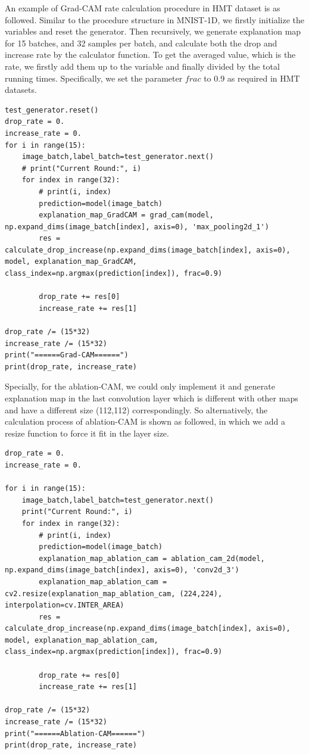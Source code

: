 \documentclass[conference]{IEEEtran}
\begin{document}
An example of Grad-CAM rate calculation procedure in HMT dataset is as followed. Similar to the procedure structure in MNIST-1D, we firstly initialize the variables and reset the generator. Then recursively, we generate explanation map for 15 batches, and 32 samples per batch, and calculate both the drop and increase rate by the calculator function. To get the averaged value, which is the rate, we firstly add them up to the variable and finally divided by the total running times. Specifically, we set the parameter $frac$ to 0.9 as required in HMT datasets.

\begin{lstlisting}
test_generator.reset()
drop_rate = 0.
increase_rate = 0.
for i in range(15):
    image_batch,label_batch=test_generator.next()
    # print("Current Round:", i)
    for index in range(32):
        # print(i, index)
        prediction=model(image_batch)
        explanation_map_GradCAM = grad_cam(model, np.expand_dims(image_batch[index], axis=0), 'max_pooling2d_1')
        res = calculate_drop_increase(np.expand_dims(image_batch[index], axis=0), model, explanation_map_GradCAM, class_index=np.argmax(prediction[index]), frac=0.9)

        drop_rate += res[0]
        increase_rate += res[1]

drop_rate /= (15*32)
increase_rate /= (15*32)
print("======Grad-CAM======")
print(drop_rate, increase_rate)
\end{lstlisting}

Specially, for the ablation-CAM, we could only implement it and generate explanation map in the last convolution layer which is different with other maps and have a different size (112,112) correspondingly. So alternatively, the calculation process of ablation-CAM is shown as followed, in which we add a resize function to force it fit in the layer size.

\begin{lstlisting}
drop_rate = 0.
increase_rate = 0.

for i in range(15):
    image_batch,label_batch=test_generator.next()
    print("Current Round:", i)
    for index in range(32):
        # print(i, index)
        prediction=model(image_batch)
        explanation_map_ablation_cam = ablation_cam_2d(model, np.expand_dims(image_batch[index], axis=0), 'conv2d_3')
        explanation_map_ablation_cam = cv2.resize(explanation_map_ablation_cam, (224,224), interpolation=cv.INTER_AREA)
        res = calculate_drop_increase(np.expand_dims(image_batch[index], axis=0), model, explanation_map_ablation_cam, class_index=np.argmax(prediction[index]), frac=0.9)

        drop_rate += res[0]
        increase_rate += res[1]

drop_rate /= (15*32)
increase_rate /= (15*32)
print("======Ablation-CAM======")
print(drop_rate, increase_rate)
\end{lstlisting}
\end{document}
